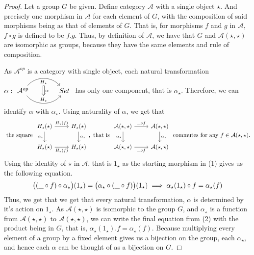 \documentclass[18pt,a4paper]{article}
\theoremstyle{definition}
\begin{document}
	\begin{proof} \setcounter{equation}{0} Let a group $G$ be given.
		Define category $\mathcal{A}$ with a single object $\star$. And precisely one morphism
		in $\mathcal{A} $ for each element of $G$, with the composition of said morphisms
		being as that of elements of $G$.
		That is, for morphisms $f$ and $g$ in $\mathcal{A}$, $f \circ g$ is defined to
		be $f.g$.
		Thus, by definition of $\mathcal{A}$, we have that $G$ and $\mathcal{A}(\star, \star)$
		are isomorphic as groups, because they have the same elements and rule of composition.

		As $\mathcal{A} ^{op}$ is a category with single object,
		 each natural transformation $\alpha:
		\begin{tikzcd}[row sep=small, column sep=large]
			\mathcal{A} ^{op} \arrow[r,bend left=50, "H_\star"{name=U, below}]
			\arrow[r, bend right = 50, "H_\star"{name=D, above}]
& Set
\arrow[Rightarrow, from=U , to=D, "\alpha"]
		\end{tikzcd}$
		has only one component, that is $\alpha_\star$. Therefore, we can
		identify $\alpha$ with $\alpha_\star$.
		Using naturality of $\alpha$, we get that
		\begin{equation}
			\text{ the square }
			\begin{tikzcd}
				H_\star(\star) \arrow[swap]{d}{\alpha_\star} \arrow{r}{H_\star(f)}
			& H_\star(\star) \arrow{d}{\alpha_\star}\\
			H_\star(\star) \arrow[swap]{r}{H_\star(f)}
			& H_\star(\star)
			\end{tikzcd}
			, \text{ that is }
			\begin{tikzcd}
				\mathcal{A} (\star,\star) \arrow[swap]{d}{\alpha_\star} \arrow{r}{\string _ \circ f}
			& \mathcal{A} (\star,\star) \arrow{d}{\alpha_\star}\\
			\mathcal{A} (\star,\star) \arrow[swap]{r}{ \string _ \circ f}
			& \mathcal{A} (\star,\star)
			\end{tikzcd}
			\text{ commutes for any } f \in \mathcal{A}(\star,\star).
		\end{equation}
		Using the identity of $\star$ in $\mathcal{A}$, that is $1_\star$ as the starting morphism
		in (1) gives us the following equation.
		\begin{equation}
			\big( (\string _ \circ f) \circ \alpha_\star \big)(1_\star) =
			\big(  \alpha_\star \circ (\string _ \circ f)\big)(1_\star)
			\implies \alpha_\star(1_\star) \circ f=\alpha_\star(f)
		\end{equation}
		Thus, we get that we get that every natural transformation,
		$\alpha$ is determined by it's action on $1_\star$.
		As $\mathcal{A} (\star, \star)$ is isomorphic to the group $G$, and
		$\alpha_\star$ is a function from $\mathcal{A} (\star,\star)$
		to $\mathcal{A} (\star,\star)$, we can write
		the final equation from (2) with the product being in $G$, that is,
		 $\alpha_\star(1_\star).f=\alpha_\star(f)$. Because
		multiplying every element of a group by a fixed element gives us a bijection on the
		group, each $\alpha_\star$, and hence each $\alpha$ can be thought of as a bijection on
		$G$.


\end{proof}
\end{document}
